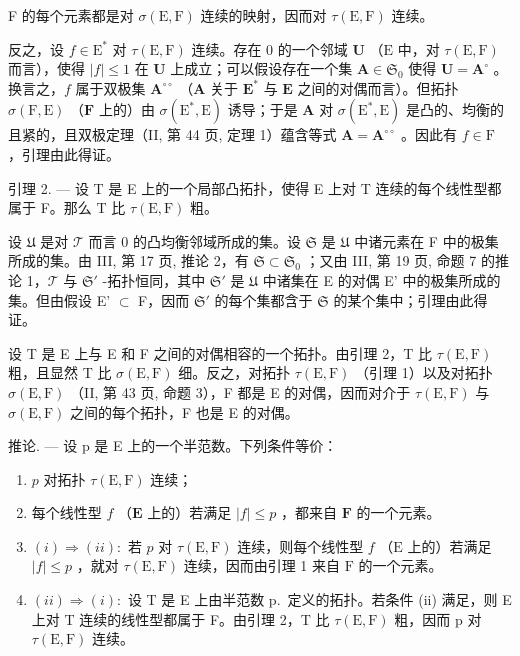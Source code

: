 F 的每个元素都是对 \(\sigma(\mathrm{E},\mathrm{F})\) 连续的映射，因而对 \(\tau(\mathrm{E},\mathrm{F})\) 连续。

反之，设 \(f \in \mathrm{E}^*\) 对 \(\tau(\mathrm{E}, \mathrm{F})\) 连续。存在 0 的一个邻域 \(\mathbf{U}\) （\(\mathrm{E}\) 中，对 \(\tau(\mathrm{E}, \mathrm{F})\) 而言），使得 \(|f| \leqslant 1\) 在 \(\mathbf{U}\) 上成立；可以假设存在一个集 \(\mathbf{A} \in \mathfrak{S}_0\) 使得 \(\mathbf{U} = \mathbf{A}^\circ\) 。换言之，\(f\) 属于双极集 \(\mathbf{A}^{\circ\circ}\) （\(\mathbf{A}\) 关于 \(\mathbf{E}^*\) 与 \(\mathbf{E}\) 之间的对偶而言）。但拓扑 \(\sigma(\mathrm{F}, \mathrm{E})\) （\(\mathbf{F}\) 上的）由 \(\sigma(\mathrm{E}^*, \mathrm{E})\) 诱导；于是 \(\mathbf{A}\) 对 \(\sigma(\mathrm{E}^*, \mathrm{E})\) 是凸的、均衡的且紧的，且双极定理（II, 第 44 页, 定理 1）蕴含等式 \(\mathbf{A} = \mathbf{A}^{\circ\circ}\) 。因此有 \(f \in \mathrm{F}\) ，引理由此得证。

引理 2. --- 设 T 是 E 上的一个局部凸拓扑，使得 E 上对 T 连续的每个线性型都属于 F。那么 T 比 \(\tau(\mathrm{E}, \mathrm{F})\) 粗。

设 \(\mathfrak{U}\) 是对 \(\mathcal{T}\) 而言 0 的凸均衡邻域所成的集。设 \(\mathfrak{S}\) 是 \(\mathfrak{U}\) 中诸元素在 F 中的极集所成的集。由 III, 第 17 页, 推论 2，有 \(\mathfrak{S} \subset \mathfrak{S}_0\) ；又由 III, 第 19 页, 命题 7 的推论 1，\(\mathcal{T}\) 与 \(\mathfrak{S}'\) -拓扑恒同，其中 \(\mathfrak{S}'\) 是 \(\mathfrak{U}\) 中诸集在 E 的对偶 E' 中的极集所成的集。但由假设 E' \(\subset\) F，因而 \(\mathfrak{S}'\) 的每个集都含于 \(\mathfrak{S}\) 的某个集中；引理由此得证。

设 T 是 E 上与 E 和 F 之间的对偶相容的一个拓扑。由引理 2，T 比 \(\tau(\mathrm{E},\mathrm{F})\) 粗，且显然 T 比 \(\sigma(\mathrm{E},\mathrm{F})\) 细。反之，对拓扑 \(\tau(\mathrm{E},\mathrm{F})\) （引理 1）以及对拓扑 \(\sigma(\mathrm{E},\mathrm{F})\) （II, 第 43 页, 命题 3），F 都是 E 的对偶，因而对介于 \(\tau(\mathrm{E},\mathrm{F})\) 与 \(\sigma(\mathrm{E},\mathrm{F})\) 之间的每个拓扑，F 也是 E 的对偶。

推论. --- 设 p 是 E 上的一个半范数。下列条件等价：

\begin{enumerate}
\def\labelenumi{(\roman{enumi})}
\item
  \(p\) 对拓扑 \(\tau(\mathrm{E},\mathrm{F})\) 连续；
\item
  每个线性型 \(f\) （\(\mathbf{E}\) 上的）若满足 \(|f| \leqslant p\) ，都来自 \(\mathbf{F}\) 的一个元素。
\item[]
  \((i) \Rightarrow (ii):\) 若 \(p\) 对 \(\tau(\mathrm{E},\mathrm{F})\) 连续，则每个线性型 \(f\) （\(\mathrm{E}\) 上的）若满足 \(|f|\leqslant p\) ，就对 \(\tau(\mathrm{E},\mathrm{F})\) 连续，因而由引理 1 来自 \(\mathrm{F}\) 的一个元素。
\item[]
  \((ii) \Rightarrow (i):\) 设 T 是 E 上由半范数 p.~定义的拓扑。若条件 (ii) 满足，则 E 上对 T 连续的线性型都属于 F。由引理 2，T 比 \(\tau(\mathrm{E}, \mathrm{F})\) 粗，因而 p 对 \(\tau(\mathrm{E}, \mathrm{F})\) 连续。
\end{enumerate}


